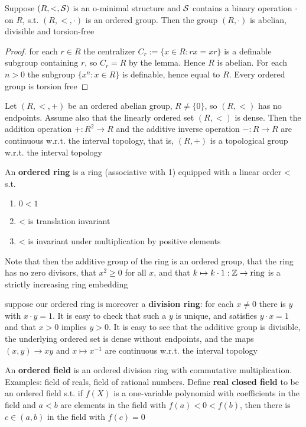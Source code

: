 \documentclass[11pt]{article}
\begin{document}
\begin{proposition}[]
Suppose \((R,<,\mathcal{S})\) is an o-minimal structure and \(\mathcal{S}\) contains a binary operation \(\cdot\)
on \(R\), s.t. \((R,<,\cdot)\) is an ordered group. Then the group \((R,\cdot)\) is abelian, divisible
and torsion-free
\end{proposition}

\begin{proof}
for each \(r\in R\) the centralizer \(C_r:=\{x\in R:rx=xr\}\) is a definable subgroup
containing \(r\), so \(C_r=R\)  by the lemma. Hence \(R\) is abelian. For each \(n>0\) the
subgroup \(\{x^n:x\in R\}\) is definable, hence equal to \(R\). Every ordered group is torsion free
\end{proof}

\begin{remark}
Let \((R,<,+)\) be an ordered abelian group, \(R\neq\{0\}\), so \((R,<)\) has no endpoints. Assume
also that the linearly ordered set \((R,<)\) is dense. Then the addition operation \(+:R^2\to R\)
and the additive inverse operation \(-:R\to R\) are continuous w.r.t. the interval topology, that
is, \((R,+)\) is a topological group w.r.t. the interval topology
\end{remark}

An \textbf{ordered ring} is a ring (associative with 1) equipped with a linear order < s.t.
\begin{enumerate}
\item \(0<1\)
\item < is translation invariant
\item < is invariant under multiplication by positive elements
\end{enumerate}

Note that then the additive group of the ring is an ordered group, that the ring has no zero
divisors, that \(x^2\ge 0\) for all \(x\), and that \(k\mapsto k\cdot 1:\mathbb{Z}\to\text{ring}\) is a strictly
increasing ring embedding

suppose our ordered ring is moreover a \textbf{division ring}: for each \(x\neq 0\) there is \(y\)
with \(x\cdot y=1\). It is easy to check that such a \(y\) is unique, and satisfies \(y\cdot x=1\) and
that \(x>0\) implies \(y>0\). It is easy to see that the additive group is divisible, the
underlying ordered set is dense without endpoints, and the maps \((x,y)\to xy\) and \(x\mapsto x^{-1}\)
are continuous w.r.t. the interval topology

An \textbf{ordered field} is an ordered division ring with commutative multiplication. Examples: field of
reals, field of rational numbers. Define \textbf{real closed field} to be an ordered field s.t.
if \(f(X)\) is a one-variable polynomial with coefficients in the field and \(a<b\) are elements
in the field with \(f(a)<0<f(b)\), then there is \(c\in(a,b)\) in the field with \(f(c)=0\)
\end{document}
